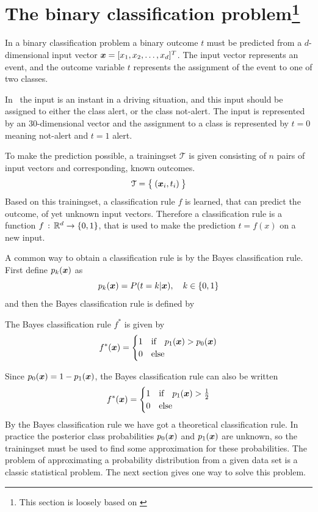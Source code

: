\section[The binary classification problem]{The binary classification problem\protect\footnote{This section is loosely based on \citet[sec 22.1-22.2]{wasserman04}}}
In a binary classification problem a binary outcome $t$ must be predicted from a $d$-dimensional input vector $\boldsymbol{x}=[x_1, x_2, \dots, x_d]^T$. The input vector represents an event, and the outcome variable $t$ represents the assignment of the event to one of two classes.
\begin{Exa}
    In \TFC\ the input is an instant in a driving situation, and this input should be assigned to either the class alert, or the class not-alert. The input is represented by an 30-dimensional vector and the assignment to a class is represented by $t=0$ meaning not-alert and $t=1$ alert.
\end{Exa}
To make the prediction possible, a trainingset $\mathcal{T}$ is given consisting of $n$ pairs of input vectors and corresponding, known outcomes.
\[
    \mathcal{T} = \bigl\{\:(\boldsymbol{x}_i, t_i)\:\bigr\}
\]
Based on this trainingset, a classification rule $f$ is learned, that can predict the outcome, of yet unknown input vectors. Therefore a classification rule is a function $f\,:\,\mathbb{R}^d\to\{0,1\}$, that is used to make the prediction $t=f(x)$ on a new input. \par
A common way to obtain a classification rule is by the Bayes classification rule. First define $p_k(\boldsymbol{x})$ as
    \[
        p_k(\boldsymbol{x}) = P(t=k|\boldsymbol{x}),\quad k\in\{0,1\}
    \]
    and then the Bayes classification rule is defined by
    \begin{definition}\label{def:bayes-rule}
        The Bayes classification rule $f^*$ is given by
        \[
            f^*(\boldsymbol{x}) = \begin{cases}
                1 & \text{if}\quad p_1(\boldsymbol{x})>p_0(\boldsymbol{x}) \\
                0 & \text{else}
            \end{cases}
        \]
    \end{definition}
    Since $p_0(\boldsymbol{x})=1-p_1(\boldsymbol{x})$, the Bayes classification rule can also be written
    \[
        f^*(\boldsymbol{x}) = \begin{cases}
            1 & \text{if}\quad p_1(\boldsymbol{x}) > \frac{1}{2} \\
            0 & \text{else}
        \end{cases}
    \]
    By the Bayes classification rule we have got a theoretical classification rule. In practice the posterior class probabilities $p_0(\boldsymbol{x})$ and $p_1(\boldsymbol{x})$ are unknown, so the trainingset must be used to find some approximation for these probabilities. The problem of approximating a probability distribution from a given data set is a classic statistical problem. The next section gives one way to solve this problem.

